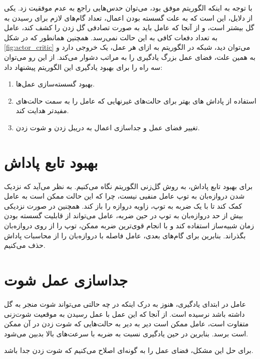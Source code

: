 با توجه به اینکه الگوریتم  موفق بود، می‌توان حدس‌هایی راجع به عدم موفقیت  زد.
یکی از دلایل، این است که به علت گسسته بودن اعمال، تعداد گام‌های لازم برای رسیدن به گل بیشتر است، و از آنجا که عامل باید به صورت تصادفی گل زدن را کشف کند،
عامل به تعداد دفعات کافی به این حالت نمی‌رسد.
همچنین همانطور که در شکل \ref{fig:actor_critic} می‌توان دید، شبکه در الگوریتم
 به ازای هر عمل، یک خروجی دارد و به همین علت، فضای عمل بزرگ یادگیری را به مراتب دشوار می‌کند.
از این رو می‌توان سه راه را برای بهبود یادگیری این الگوریتم پیشنهاد داد:
\begin{enumerate}
    \item بهبود گسسته‌سازی عمل‌ها.
    \item استفاده از پاداش های بهتر برای حالت‌های غیرنهایی که عامل را به سمت حالت‌های مفید‌تر هدایت کند.
    \item تغییر فضای عمل و جدا‌سازی اعمال به دریبل‌ زدن و شوت زدن.
\end{enumerate}

\section{بهبود تابع پاداش}
برای بهبود تابع پاداش، به روش گل‌زنی الگوریتم  نگاه می‌کنیم.
به نظر می‌آید که نزدیک شدن دروازه‌بان به توپ عامل منفیی نیست، چرا که این حالت ممکن است به عامل کمک کند تا با یک ضربه به توپ، زاویه دروازه را باز کند.
همچنین در صورت نزدیکی بیش از حد دروازه‌بان به توپ در حین ضربه، عامل می‌تواند از قابلیت گسسته بودن زمان شبیه‌ساز استفاده کند و با انجام قوی‌ترین ضربه ممکن، توپ را از روی دروازه‌بان بگذراند.
بنابرین برای گام‌های بعدی، عامل فاصله با دروازه‌بان را از محاسبات پاداش حذف می‌کنیم.


\section{جدا‌سازی عمل شوت}
عامل در ابتدای یادگیری، هنوز به درک اینکه در چه حالتی می‌تواند شوت منجر به گل داشته باشد نرسیده است.
از آنجا که این عمل با عمل رسیدن به موقعیت شوت‌زنی متفاوت است، عامل ممکن است دیر به دیر به حالت‌هایی که شوت زدن در آن ممکن است برسد.
بنابرین در حین یادگیری نسبت به ضربه با سرعت‌های بالا بدبین می‌شود.

برای حل این مشکل، فضای عمل را به گونه‌ای اصلاح می‌کنیم که شوت زدن جدا باشد.
